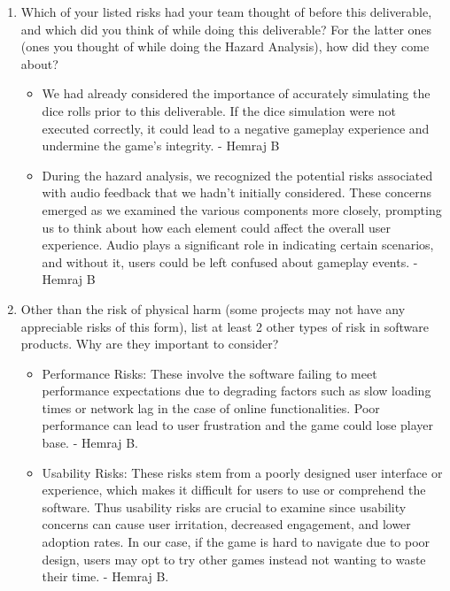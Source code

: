 \documentclass{article}
\begin{document}
\begin{enumerate}
    \item Which of your listed risks had your team thought of before this
    deliverable, and which did you think of while doing this deliverable? For
    the latter ones (ones you thought of while doing the Hazard Analysis), how
    did they come about?
    
    \begin{itemize}
        \item We had already considered the importance of accurately simulating the dice rolls prior to this deliverable. If the dice simulation were not executed correctly, it could lead to a negative gameplay experience and undermine the game's integrity. - Hemraj B
        \item During the hazard analysis, we recognized the potential risks associated with audio feedback that we hadn't initially considered. These concerns emerged as we examined the various components more closely, prompting us to think about how each element could affect the overall user experience. Audio plays a significant role in indicating certain scenarios, and without it, users could be left confused about gameplay events. - Hemraj B
    \end{itemize}
    
    \item Other than the risk of physical harm (some projects may not have any
    appreciable risks of this form), list at least 2 other types of risk in
    software products. Why are they important to consider?

    \begin{itemize}
        \item Performance Risks: These involve the software failing to meet performance expectations due to degrading factors such as slow loading times or network lag in the case of online functionalities. Poor performance can lead to user frustration and the game could lose player base. - Hemraj B.
        \item Usability Risks: These risks stem from a poorly designed user interface or experience, which makes it difficult for users to use or comprehend the software. Thus usability risks are crucial to examine since usability concerns can cause user irritation, decreased engagement, and lower adoption rates. In our case, if the game is hard to navigate due to poor design, users may opt to try other games instead not wanting to waste their time. - Hemraj B.
	\end{itemize}



\end{enumerate}
\end{document}
